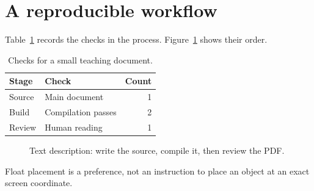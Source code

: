 \documentclass{article}
\begin{document}
\section{A reproducible workflow}
Table~\ref{tab:checks} records the checks in the process.
Figure~\ref{fig:workflow} shows their order.

\begin{table}[htbp]
  \centering
  \caption{Checks for a small teaching document.}
  \label{tab:checks}
  \begin{tabular}{llr}
    \toprule
    Stage & Check & Count \\
    \midrule
    Source & Main document & 1 \\
    Build & Compilation passes & 2 \\
    Review & Human reading & 1 \\
    \bottomrule
  \end{tabular}
\end{table}

\begin{figure}[htbp]
  \centering
  \caption{Text description: write the source, compile it, then review the PDF.}
  \label{fig:workflow}
\end{figure}

Float placement is a preference, not an instruction to place an object
at an exact screen coordinate.
\end{document}
